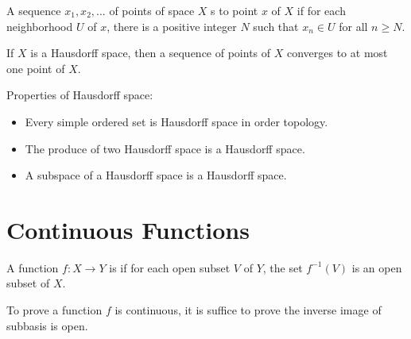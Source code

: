 \begin{definition}
    A sequence $x_1, x_2, ... $ of points of space $X$ s to point $x$ of $X$ if for each neighborhood $U$ of $x$, there is a positive integer $N$ such that $x_n \in U$ for all $n \geq N$.
\end{definition}

\begin{theorem}
If $X$ is a Hausdorff space, then a sequence of points of $X$ converges to at most one point of $X$.    
\end{theorem}

\begin{theorem}
Properties of Hausdorff space:
\begin{itemize}
    \item Every simple ordered set is Hausdorff space in order topology.
    \item The produce of two Hausdorff space is a Hausdorff space.
    \item A subspace of a Hausdorff space is a Hausdorff space. 
\end{itemize}
\end{theorem}



\section{Continuous Functions}


\begin{definition}
    A function $f: X \rightarrow Y$ is  if for each open subset $V$ of $Y$, the set $f^{-1}(V)$ is an open subset of $X$.
\end{definition}

To prove a function $f$ is continuous, it is suffice to prove the inverse image of subbasis is open.

